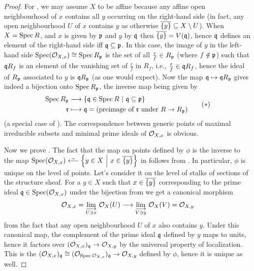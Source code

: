 \documentclass[a4paper,parskip=half,numbers=enddot, DIV=12]{scrreprt}
\begin{document}
\begin{proof}
    For , we may assume $X$ to be affine because any affine open neighbourhood of $x$ contains all $y$ occurring on the right-hand side (in fact, any open neighbourhood $U$ of $x$ contains $y$ as otherwise $\overline{\{y\}}\subseteq X\setminus U$). When $X=\operatorname{Spec} R$, and $x$ is given by $\mathfrak{p}$ and $y$ by $\mathfrak{q}$ then $\overline{\{y\}} = V(\mathfrak{q})$, hence $\mathfrak{q}$ defines an element of the right-hand side iff $\mathfrak{q}\subseteq \mathfrak{p}$. In this case, the image of $y$ in the left-hand side $\operatorname{Spec}(\mathcal{O}_{X,x})\cong \operatorname{Spec} R_{\mathfrak{p}}$ is the set of all $\frac{r}{f}\in R_{\mathfrak{p}}$ (where $f\notin\mathfrak{p}$) such that $\mathfrak{q} R_f$ is an element of the vanishing set of $\frac{r}{f}$ in $R_f$, i.e., $\frac{r}{f}\in \mathfrak{q} R_f$, hence the ideal of $R_{\mathfrak{p}}$ associated to $y$ is $\mathfrak{q} R_{\mathfrak{p}}$ (as one would expect). Now the map $\mathfrak{q}\mapsto\mathfrak{q} R_{\mathfrak{p}}$ gives indeed a bijection onto $\operatorname{Spec} R_{\mathfrak{p}}$, the inverse map being given by 
    \begin{align}\lbl{eq:localizationBijection}
    	\begin{split}
	    	\Spec R_\pp &\morphism \left\{\qq\in\Spec R\st\qq\subseteq\pp\right\}\\ \rr&\longmapsto \qq= (\text{preimage of }\rr\text{ under }R\to R_\pp)
    	\end{split}\tag{$*$}
    \end{align}
    (a special case of \cite[Corollary~2.3.1]{alg1}). The correspondence between generic points of maximal irreducible subsets and minimal prime ideals of $\mathcal{O}_{X,x}$ is obvious.
    
    Now we prove . The fact that the map on points defined by $\phi$ is the inverse to the map $\Spec(\Oo_{X,x}) \lisomorphism \left\{y\in X\st x\in \ov{\{y\}}\right\}$ in  follows from . In particular, $\phi$ is unique on the level of points. Let's consider it on the level of stalks of sections of the structure sheaf. For a $y\in X$ such that $x\in\overline{\{y\}}$ corresponding to the prime ideal $\mathfrak{q}\in\operatorname{Spec}(\mathcal{O}_{X,x})$ under the bijection from  we get a canonical morphism
    \begin{align*}
        \Oo_{X,x} = \colimit[U\ni x] \Oo_X(U) \morphism \colimit[V\ni y] \Oo_X(V)=\Oo_{X,y}
    \end{align*}
    from the fact that any open neighbourhood $U$ of $x$ also contains $y$. Under this canonical map, the complement of the prime ideal $\mathfrak{q}$ defined by $y$ maps to units, hence it factors over $(\Oo_{X,x})_\qq\morphism \Oo_{X,y}$ by the universal property of localization. This is the $(\Oo_{X,x})_\qq \cong (\Oo_{\Spec \Oo_{X,x}})_\qq \morphism \Oo_{X,y}$ defined by $\phi$, hence it is unique as well.
\end{proof}
\end{document}
